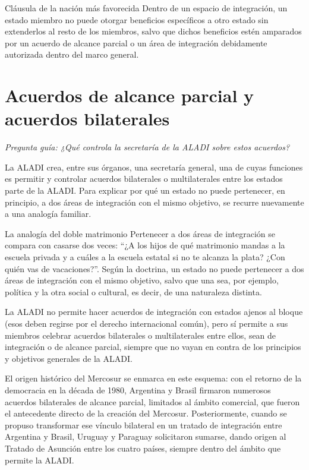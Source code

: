 \documentclass[12pt,oneside]{book}
\begin{document}
\begin{definition}{Cláusula de la nación más favorecida}
Dentro de un espacio de integración, un estado miembro no puede otorgar beneficios específicos a otro estado sin extenderlos al resto de los miembros, salvo que dichos beneficios estén amparados por un acuerdo de alcance parcial o un área de integración debidamente autorizada dentro del marco general.
\end{definition}

\section{Acuerdos de alcance parcial y acuerdos bilaterales}

\textit{Pregunta guía: ¿Qué controla la secretaría de la ALADI sobre estos acuerdos?}

La ALADI crea, entre sus órganos, una secretaría general, una de cuyas funciones es permitir y controlar acuerdos bilaterales o multilaterales entre los estados parte de la ALADI. Para explicar por qué un estado no puede pertenecer, en principio, a dos áreas de integración con el mismo objetivo, se recurre nuevamente a una analogía familiar.

\begin{example}{La analogía del doble matrimonio}
Pertenecer a dos áreas de integración se compara con casarse dos veces: ``¿A los hijos de qué matrimonio mandas a la escuela privada y a cuáles a la escuela estatal si no te alcanza la plata? ¿Con quién vas de vacaciones?''. Según la doctrina, un estado no puede pertenecer a dos áreas de integración con el mismo objetivo, salvo que una sea, por ejemplo, política y la otra social o cultural, es decir, de una naturaleza distinta.
\end{example}

La ALADI no permite hacer acuerdos de integración con estados ajenos al bloque (esos deben regirse por el derecho internacional común), pero sí permite a sus miembros celebrar acuerdos bilaterales o multilaterales entre ellos, sean de integración o de alcance parcial, siempre que no vayan en contra de los principios y objetivos generales de la ALADI.

El origen histórico del Mercosur se enmarca en este esquema: con el retorno de la democracia en la década de 1980, Argentina y Brasil firmaron numerosos acuerdos bilaterales de alcance parcial, limitados al ámbito comercial, que fueron el antecedente directo de la creación del Mercosur. Posteriormente, cuando se propuso transformar ese vínculo bilateral en un tratado de integración entre Argentina y Brasil, Uruguay y Paraguay solicitaron sumarse, dando origen al Tratado de Asunción entre los cuatro países, siempre dentro del ámbito que permite la ALADI.
\end{document}

